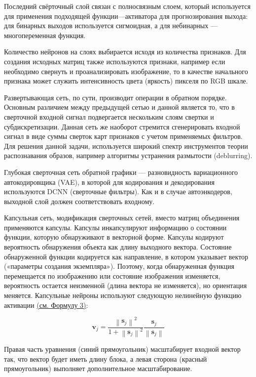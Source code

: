     Последний свёрточный слой связан с полносвязным слоем, который используется для применения подходящей функции—активатора для прогнозирования выхода: для бинарных выходов используется сигмоидная, а для небинарных — многопеременная функция.
    
    Количество нейронов на слоях выбирается исходя из количества признаков. Для создания исходных матриц также используются признаки, например если необходимо свернуть и проанализировать изображение, то в качестве начального признака может служить интенсивность цвета (яркость) пикселя по RGB шкале.
    
    Развертывающая сеть, по сути, производит операции в обратном порядке. Основным различием между предыдущей сетью и данной является то, что в сверточной входной сигнал подвергается нескольким слоям свертки и субдискретизации. Данная сеть же наоборот стремится сгенерировать входной сигнал в виде суммы сверток карт признаков с учетом применяемых фильтров. Для решения данной задачи, используется широкий спектр инструментов теории распознавания образов, например алгоритмы устранения размытости (deblurring).
    
    Глубокая сверточная сеть обратной графики — разновидность вариационного автокодировщика (VAE), в которой для кодирования и декодирования используются DCNN (сверточные фильтры). Как и в случае автоэнкодеров, выходной слой должен соответствовать входному. 
    
    Капсульная сеть, модификация сверточных сетей, вместо матриц объединения применяются капсулы. Капсулы инкапсулируют информацию о состоянии функции, которую обнаруживают в векторной форме. Капсулы кодируют вероятность обнаружения объекта как длину выходного вектора. Состояние обнаруженной функции кодируется как направление, в котором указывает вектор («параметры создания экземпляра»). Поэтому, когда обнаруженная функция перемещается по изображению или состояние изображения изменяется, вероятность остается неизменной (длина вектора не изменяется), но ориентация меняется. Капсульные нейроны используют следующую нелинейную функцию активации \hyperref[eq:eq3]{(см. Формулу 3)}:

    \begin{equation}
        \mathbf{v}_j=\frac{\left\|\mathbf{s}_j\right\|^2}{1+\left\|\mathbf{s}_j\right\|^2} \frac{\mathbf{s}_j}{\left\|\mathbf{s}_j\right\|}
        \label{eq:eq3}
    \end{equation}

    Правая часть уравнения (синий прямоугольник) масштабирует входной вектор так, что вектор будет иметь длину блока, а левая сторона (красный прямоугольник) выполняет дополнительное масштабирование.

